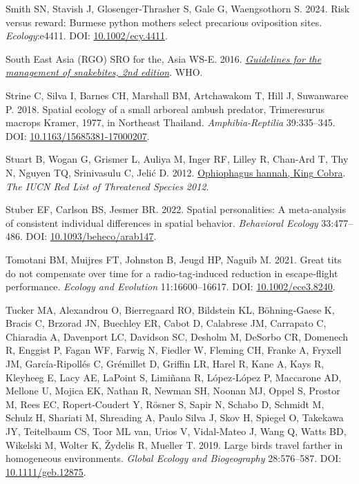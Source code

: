 \documentclass[10pt,a4paper]{article}
\newlength{\cslhangindent}
\newenvironment{CSLReferences}[2] %
 {\begin{list}{}{%
  \setlength{\itemindent}{0pt}
  \setlength{\leftmargin}{0pt}
  \setlength{\parsep}{0pt}
  \ifodd #1
   \setlength{\leftmargin}{\cslhangindent}
   \setlength{\itemindent}{-1\cslhangindent}
  \fi
  \setlength{\itemsep}{#2\baselineskip}}}
 {\end{list}}
\begin{document}
\begin{CSLReferences}{1}{0}
Smith SN, Stavish J, Glosenger‐Thrasher S, Gale G, Waengsothorn S. 2024. Risk versus reward: {Burmese} python mothers select precarious oviposition sites. \emph{Ecology}:e4411. DOI: \href{https://doi.org/10.1002/ecy.4411}{10.1002/ecy.4411}.

South East Asia (RGO) SRO for the, Asia WS-E. 2016. \emph{\href{https://www.who.int/publications/i/item/9789290225300}{Guidelines for the management of snakebites, 2nd edition}}. WHO.

Strine C, Silva I, Barnes CH, Marshall BM, Artchawakom T, Hill J, Suwanwaree P. 2018. Spatial ecology of a small arboreal ambush predator, {Trimeresurus} macrops {Kramer}, 1977, in {Northeast} {Thailand}. \emph{Amphibia-Reptilia} 39:335--345. DOI: \href{https://doi.org/10.1163/15685381-17000207}{10.1163/15685381-17000207}.

Stuart B, Wogan G, Grismer L, Auliya M, Inger RF, Lilley R, Chan-Ard T, Thy N, Nguyen TQ, Srinivasulu C, Jelić D. 2012. \href{http://dx.doi.org/10.2305/IUCN.UK.2012-\%201.RLTS.T177540A1491874.en\%0ACopyright:}{Ophiophagus hannah, {King} {Cobra}}. \emph{The IUCN Red List of Threatened Species 2012}.

Stuber EF, Carlson BS, Jesmer BR. 2022. Spatial personalities: A meta-analysis of consistent individual differences in spatial behavior. \emph{Behavioral Ecology} 33:477--486. DOI: \href{https://doi.org/10.1093/beheco/arab147}{10.1093/beheco/arab147}.

Tomotani BM, Muijres FT, Johnston B, Jeugd HP, Naguib M. 2021. Great tits do not compensate over time for a radio‐tag‐induced reduction in escape‐flight performance. \emph{Ecology and Evolution} 11:16600--16617. DOI: \href{https://doi.org/10.1002/ece3.8240}{10.1002/ece3.8240}.

Tucker MA, Alexandrou O, Bierregaard RO, Bildstein KL, Böhning‐Gaese K, Bracis C, Brzorad JN, Buechley ER, Cabot D, Calabrese JM, Carrapato C, Chiaradia A, Davenport LC, Davidson SC, Desholm M, DeSorbo CR, Domenech R, Enggist P, Fagan WF, Farwig N, Fiedler W, Fleming CH, Franke A, Fryxell JM, García‐Ripollés C, Grémillet D, Griffin LR, Harel R, Kane A, Kays R, Kleyheeg E, Lacy AE, LaPoint S, Limiñana R, López‐López P, Maccarone AD, Mellone U, Mojica EK, Nathan R, Newman SH, Noonan MJ, Oppel S, Prostor M, Rees EC, Ropert‐Coudert Y, Rösner S, Sapir N, Schabo D, Schmidt M, Schulz H, Shariati M, Shreading A, Paulo Silva J, Skov H, Spiegel O, Takekawa JY, Teitelbaum CS, Toor ML van, Urios V, Vidal‐Mateo J, Wang Q, Watts BD, Wikelski M, Wolter K, Žydelis R, Mueller T. 2019. Large birds travel farther in homogeneous environments. \emph{Global Ecology and Biogeography} 28:576--587. DOI: \href{https://doi.org/10.1111/geb.12875}{10.1111/geb.12875}.


\end{CSLReferences}
\end{document}
